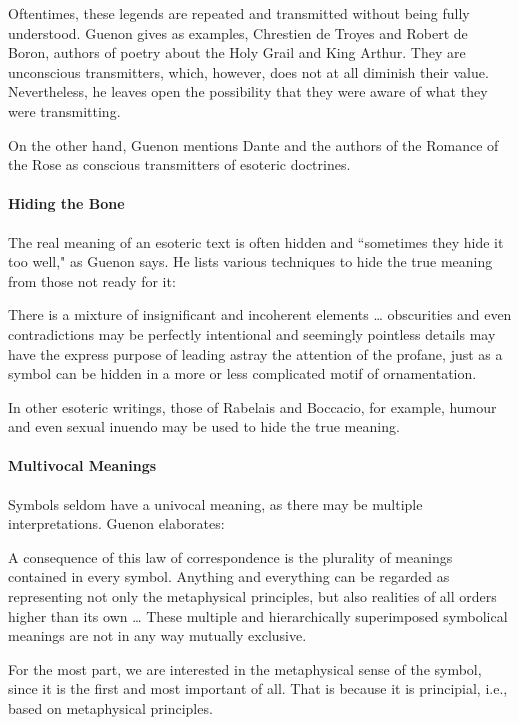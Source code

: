 Oftentimes, these legends are repeated and transmitted without being fully understood. Guenon gives as examples, Chrestien de Troyes and Robert de Boron, authors of poetry about the Holy Grail and King Arthur. They are unconscious transmitters, which, however, does not at all diminish their value. Nevertheless, he leaves open the possibility that they were aware of what they were transmitting.

On the other hand, Guenon mentions Dante and the authors of the Romance of the Rose as conscious transmitters of esoteric doctrines.

\paragraph{Hiding the Bone}
The real meaning of an esoteric text is often hidden and ``sometimes they hide it too well," as Guenon says. He lists various techniques to hide the true meaning from those not ready for it:

\begin{quotex}
There is a mixture of insignificant and incoherent elements … obscurities and even contradictions may be perfectly intentional and seemingly pointless details may have the express purpose of leading astray the attention of the profane, just as a symbol can be hidden in a more or less complicated motif of ornamentation. 

\end{quotex}
In other esoteric writings, those of Rabelais and Boccacio, for example, humour and even sexual inuendo may be used to hide the true meaning.

\paragraph{Multivocal Meanings}
Symbols seldom have a univocal meaning, as there may be multiple interpretations. Guenon elaborates:

\begin{quotex}
A consequence of this law of correspondence is the plurality of meanings contained in every symbol. Anything and everything can be regarded as representing not only the metaphysical principles, but also realities of all orders higher than its own … These multiple and hierarchically superimposed symbolical meanings are not in any way mutually exclusive. 

\end{quotex}
For the most part, we are interested in the metaphysical sense of the symbol, since it is the first and most important of all. That is because it is principial, i.e., based on metaphysical principles.



